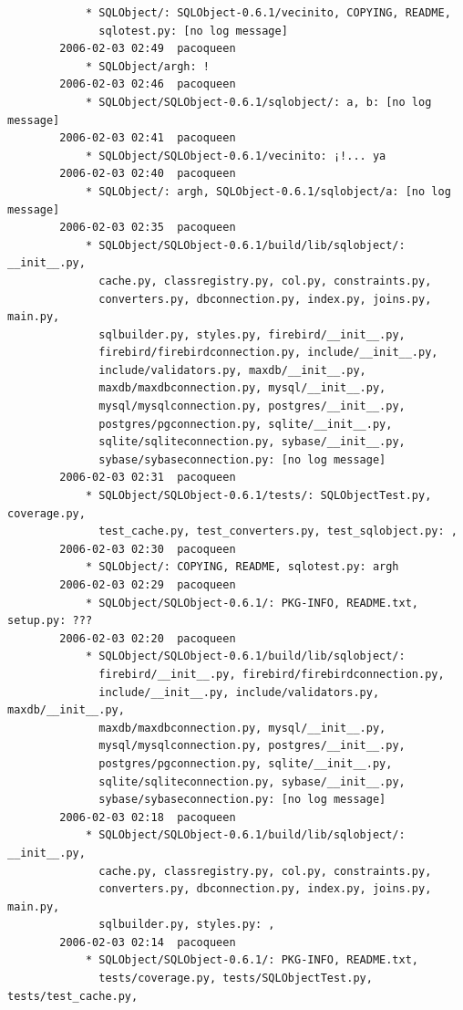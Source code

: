 \documentclass[a4paper]{article}
\begin{document}
\begin{verbatim}
            * SQLObject/: SQLObject-0.6.1/vecinito, COPYING, README,
              sqlotest.py: [no log message]
        2006-02-03 02:49  pacoqueen
            * SQLObject/argh: !
        2006-02-03 02:46  pacoqueen
            * SQLObject/SQLObject-0.6.1/sqlobject/: a, b: [no log message]
        2006-02-03 02:41  pacoqueen
            * SQLObject/SQLObject-0.6.1/vecinito: ¡!... ya
        2006-02-03 02:40  pacoqueen
            * SQLObject/: argh, SQLObject-0.6.1/sqlobject/a: [no log message]
        2006-02-03 02:35  pacoqueen
            * SQLObject/SQLObject-0.6.1/build/lib/sqlobject/: __init__.py,
              cache.py, classregistry.py, col.py, constraints.py,
              converters.py, dbconnection.py, index.py, joins.py, main.py,
              sqlbuilder.py, styles.py, firebird/__init__.py,
              firebird/firebirdconnection.py, include/__init__.py,
              include/validators.py, maxdb/__init__.py,
              maxdb/maxdbconnection.py, mysql/__init__.py,
              mysql/mysqlconnection.py, postgres/__init__.py,
              postgres/pgconnection.py, sqlite/__init__.py,
              sqlite/sqliteconnection.py, sybase/__init__.py,
              sybase/sybaseconnection.py: [no log message]
        2006-02-03 02:31  pacoqueen
            * SQLObject/SQLObject-0.6.1/tests/: SQLObjectTest.py, coverage.py,
              test_cache.py, test_converters.py, test_sqlobject.py: ,
        2006-02-03 02:30  pacoqueen
            * SQLObject/: COPYING, README, sqlotest.py: argh
        2006-02-03 02:29  pacoqueen
            * SQLObject/SQLObject-0.6.1/: PKG-INFO, README.txt, setup.py: ???
        2006-02-03 02:20  pacoqueen
            * SQLObject/SQLObject-0.6.1/build/lib/sqlobject/:
              firebird/__init__.py, firebird/firebirdconnection.py,
              include/__init__.py, include/validators.py, maxdb/__init__.py,
              maxdb/maxdbconnection.py, mysql/__init__.py,
              mysql/mysqlconnection.py, postgres/__init__.py,
              postgres/pgconnection.py, sqlite/__init__.py,
              sqlite/sqliteconnection.py, sybase/__init__.py,
              sybase/sybaseconnection.py: [no log message]
        2006-02-03 02:18  pacoqueen
            * SQLObject/SQLObject-0.6.1/build/lib/sqlobject/: __init__.py,
              cache.py, classregistry.py, col.py, constraints.py,
              converters.py, dbconnection.py, index.py, joins.py, main.py,
              sqlbuilder.py, styles.py: ,
        2006-02-03 02:14  pacoqueen
            * SQLObject/SQLObject-0.6.1/: PKG-INFO, README.txt,
              tests/coverage.py, tests/SQLObjectTest.py, tests/test_cache.py,

\end{verbatim}
\end{document}
